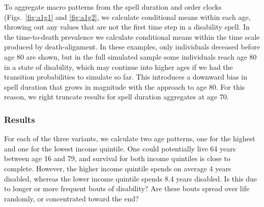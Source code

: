 \documentclass[a4paper,left=1.25cm,right=1.25cm,top=1.25cm,bottom=1.25cm]{article}
\begin{document}
To aggregate macro patterns from the spell duration and order clocks (Figs.~\ref{fig:a1g1} and \ref{fig:a1g2}, we calculate conditional means within each age, throwing out any values that are not the first time step in a disability spell. In the time-to-death prevalence we calculate conditional means within the time scale produced by death-alignment. In these examples, only individuals deceased before age 80 are shown, but in the full simulated sample some individuals reach age 80 in a state of disability, which may continue into higher ages if we had the transition probabilities to simulate so far. This introduces a downward bias in spell duration that grows in magnitude with the approach to age 80. For this reason, we right truncate results for spell duration aggregates at age 70. 

\FloatBarrier

\subsubsection{Results}
For each of the three variants, we calculate two age patterns, one for the highest and one for the lowest income quintile. One could potentially live 64 years between age 16 and 79, and survival for both income quintiles is close to complete. However, the higher income quintile spends on average 4 years disabled, whereas the lower income quintile spends 8.4 years disabled. Is this due to longer or more frequent bouts of disability? Are these bouts spread over life randomly, or concentrated toward the end?
\end{document}
